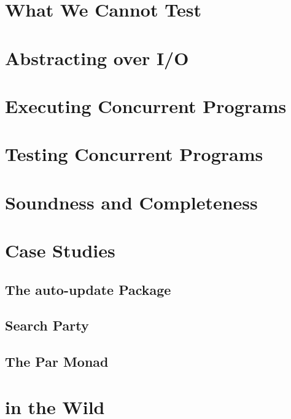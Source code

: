 \blindtext

\section{What We Cannot Test}
\label{sec:dejafu-scope}

\blindtext

\section{Abstracting over I/O}
\label{sec:dejafu-monadconc}

\blindtext

\section{Executing Concurrent Programs}
\label{sec:dejafu-execution}

\blindtext

\section{Testing Concurrent Programs}
\label{sec:dejafu-testing}

\blindtext

\section{Soundness and Completeness}
\label{sec:dejafu-correctness}

\blindtext

\section{Case Studies}
\label{sec:dejafu-casestudies}

\blindtext

\subsection{The auto-update Package}
\subsection{Search Party}
\subsection{The Par Monad}

\section{\dejafu{} in the Wild}
\label{sec:dejafu-evaluation}

